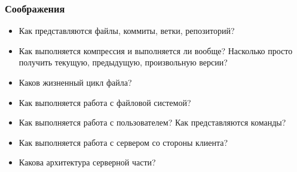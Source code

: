 \documentclass[xetex,mathserif,serif]{beamer}
\begin{document}
	\begin{frame}
		\frametitle{Соображения}
		\begin{itemize}
			\item Как представляются файлы, коммиты, ветки, репозиторий?
			\item Как выполняется компрессия и выполняется ли вообще? Насколько просто получить текущую, предыдущую, произвольную версии?
			\item Каков жизненный цикл файла?
			\item Как выполняется работа с файловой системой?
			\item Как выполняется работа с пользователем? Как представляются команды?
			\item Как выполняется работа с сервером со стороны клиента?
			\item Какова архитектура серверной части?
		\end{itemize}
	\end{frame}
\end{document}
